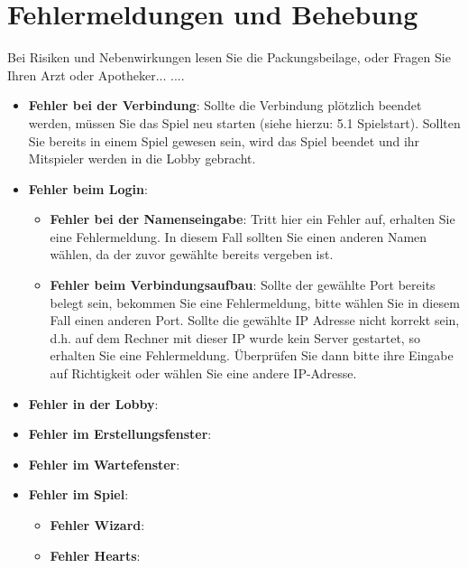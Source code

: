 \documentclass[titlepage,10pt,a4paper]{article}
\begin{document}
\section{Fehlermeldungen und Behebung}
Bei Risiken und Nebenwirkungen lesen Sie die Packungsbeilage, oder Fragen Sie Ihren Arzt oder Apotheker...
....\\
\begin{itemize}
\item \textbf{Fehler bei der Verbindung}:
		Sollte die Verbindung plötzlich beendet werden, müssen Sie das Spiel neu starten (siehe hierzu: 5.1 Spielstart). Sollten Sie bereits in einem Spiel gewesen sein, wird das Spiel beendet und ihr Mitspieler werden in die Lobby gebracht.
\item \textbf{Fehler beim Login}:
	\begin{itemize}
	\item \textbf{Fehler bei der Namenseingabe}:
		Tritt hier ein Fehler auf, erhalten Sie eine Fehlermeldung. In diesem Fall sollten Sie einen anderen Namen wählen, da der zuvor gewählte bereits vergeben ist.
	\item \textbf{Fehler beim Verbindungsaufbau}:
		Sollte der gewählte Port bereits belegt sein, bekommen Sie eine Fehlermeldung, bitte wählen Sie in diesem Fall einen anderen Port.
		Sollte die gewählte IP Adresse nicht korrekt sein, d.h. auf dem Rechner mit dieser IP wurde kein Server gestartet, so erhalten Sie eine Fehlermeldung. Überprüfen Sie dann bitte ihre Eingabe auf Richtigkeit oder wählen Sie eine andere IP-Adresse.
	\end{itemize}
\item \textbf{Fehler in der Lobby}:
\item \textbf{Fehler im Erstellungsfenster}:
\item \textbf{Fehler im Wartefenster}:
\item \textbf{Fehler im Spiel}:
	\begin{itemize}
	\item \textbf{Fehler Wizard}:
	\item \textbf{Fehler Hearts}:
	\end{itemize}
\end{itemize}
\end{document}
